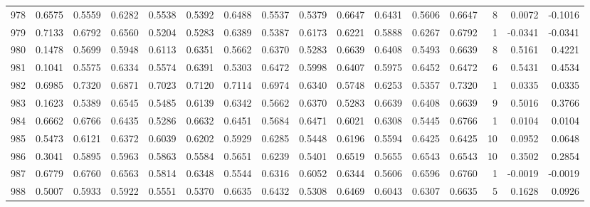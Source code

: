 \begin{tabular}{lrrrrrrrrrrrrrrr}
978 &      0.6575 &  0.5559 &  0.6282 &  0.5538 &  0.5392 &  0.6488 &  0.5537 &  0.5379 &  0.6647 &  0.6431 &   0.5606 &     0.6647 &      8 &                    0.0072 &                    -0.1016 \\
979 &      0.7133 &  0.6792 &  0.6560 &  0.5204 &  0.5283 &  0.6389 &  0.5387 &  0.6173 &  0.6221 &  0.5888 &   0.6267 &     0.6792 &      1 &                   -0.0341 &                    -0.0341 \\
980 &      0.1478 &  0.5699 &  0.5948 &  0.6113 &  0.6351 &  0.5662 &  0.6370 &  0.5283 &  0.6639 &  0.6408 &   0.5493 &     0.6639 &      8 &                    0.5161 &                     0.4221 \\
981 &      0.1041 &  0.5575 &  0.6334 &  0.5574 &  0.6391 &  0.5303 &  0.6472 &  0.5998 &  0.6407 &  0.5975 &   0.6452 &     0.6472 &      6 &                    0.5431 &                     0.4534 \\
982 &      0.6985 &  0.7320 &  0.6871 &  0.7023 &  0.7120 &  0.7114 &  0.6974 &  0.6340 &  0.5748 &  0.6253 &   0.5357 &     0.7320 &      1 &                    0.0335 &                     0.0335 \\
983 &      0.1623 &  0.5389 &  0.6545 &  0.5485 &  0.6139 &  0.6342 &  0.5662 &  0.6370 &  0.5283 &  0.6639 &   0.6408 &     0.6639 &      9 &                    0.5016 &                     0.3766 \\
984 &      0.6662 &  0.6766 &  0.6435 &  0.5286 &  0.6632 &  0.6451 &  0.5684 &  0.6471 &  0.6021 &  0.6308 &   0.5445 &     0.6766 &      1 &                    0.0104 &                     0.0104 \\
985 &      0.5473 &  0.6121 &  0.6372 &  0.6039 &  0.6202 &  0.5929 &  0.6285 &  0.5448 &  0.6196 &  0.5594 &   0.6425 &     0.6425 &     10 &                    0.0952 &                     0.0648 \\
986 &      0.3041 &  0.5895 &  0.5963 &  0.5863 &  0.5584 &  0.5651 &  0.6239 &  0.5401 &  0.6519 &  0.5655 &   0.6543 &     0.6543 &     10 &                    0.3502 &                     0.2854 \\
987 &      0.6779 &  0.6760 &  0.6563 &  0.5814 &  0.6348 &  0.5544 &  0.6316 &  0.6052 &  0.6344 &  0.5606 &   0.6596 &     0.6760 &      1 &                   -0.0019 &                    -0.0019 \\
988 &      0.5007 &  0.5933 &  0.5922 &  0.5551 &  0.5370 &  0.6635 &  0.6432 &  0.5308 &  0.6469 &  0.6043 &   0.6307 &     0.6635 &      5 &                    0.1628 &                     0.0926 \\

\end{tabular}
